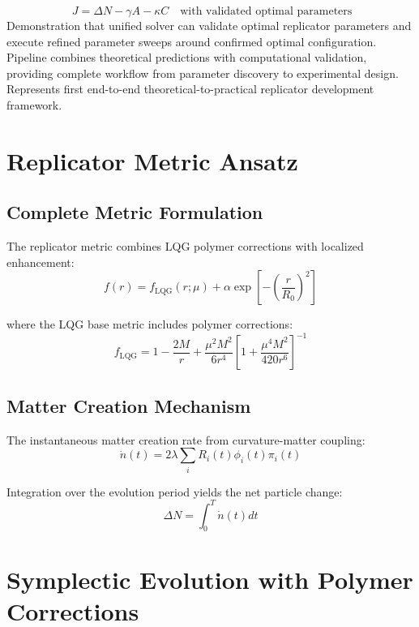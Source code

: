 \documentclass[11pt]{article}
\begin{document}
\[\
J = \Delta N - \gamma A - \kappa C \quad \text{with validated optimal parameters}
\]
Demonstration that unified solver can validate optimal replicator parameters and execute refined parameter sweeps around confirmed optimal configuration. Pipeline combines theoretical predictions with computational validation, providing complete workflow from parameter discovery to experimental design. Represents first end-to-end theoretical-to-practical replicator development framework.

\section{Replicator Metric Ansatz}

\subsection{Complete Metric Formulation}

The replicator metric combines LQG polymer corrections with localized enhancement:
\begin{equation}
f(r) = f_{\text{LQG}}(r;\mu) + \alpha \exp\left[-\left(\frac{r}{R_0}\right)^2\right]
\end{equation}

where the LQG base metric includes polymer corrections:
\begin{equation}
f_{\text{LQG}} = 1 - \frac{2M}{r} + \frac{\mu^2 M^2}{6r^4}\left[1 + \frac{\mu^4 M^2}{420r^6}\right]^{-1}
\end{equation}

\subsection{Matter Creation Mechanism}

The instantaneous matter creation rate from curvature-matter coupling:
\begin{equation}
\dot{n}(t) = 2\lambda \sum_i R_i(t) \phi_i(t) \pi_i(t)
\end{equation}

Integration over the evolution period yields the net particle change:
\begin{equation}
\Delta N = \int_0^T \dot{n}(t) dt
\end{equation}

\section{Symplectic Evolution with Polymer Corrections}
\end{document}
